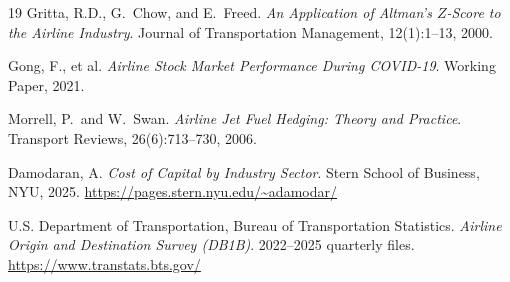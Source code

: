 \documentclass[12pt,a4paper]{article}
\begin{document}
\begin{thebibliography}{19}
Gritta, R.D., G.\ Chow, and E.\ Freed.
\emph{An Application of Altman's $Z$-Score to the Airline Industry}.
Journal of Transportation Management, 12(1):1--13, 2000.

Gong, F., et al.
\emph{Airline Stock Market Performance During COVID-19}.
Working Paper, 2021.

Morrell, P.\ and W.\ Swan.
\emph{Airline Jet Fuel Hedging: Theory and Practice}.
Transport Reviews, 26(6):713--730, 2006.

Damodaran, A.
\emph{Cost of Capital by Industry Sector}. Stern School of Business, NYU, 2025.
\url{https://pages.stern.nyu.edu/~adamodar/}

U.S. Department of Transportation, Bureau of Transportation Statistics.
\emph{Airline Origin and Destination Survey (DB1B)}.
2022--2025 quarterly files. \url{https://www.transtats.bts.gov/}

\end{thebibliography}
\end{document}
